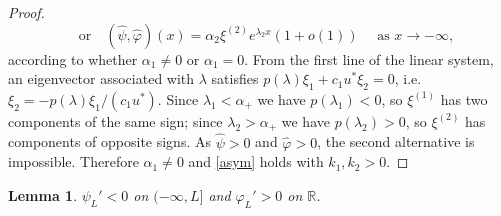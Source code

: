 \documentclass[reqno]{amsart}
\theoremstyle{plain}
\newtheorem{lemma}[theorem]{Lemma}
\theoremstyle{definition}
\theoremstyle{remark}
\begin{document}
\begin{proof}
\[	\quad\text{or}\quad
	(\hat\psi,\hat\varphi)(x)=\alpha_2\xi^{(2)}e^{\lambda_2x}(1+o(1))
	\quad\text{ as }x\to-\infty,
	\]
	according to whether $\alpha_1\ne0$ or $\alpha_1=0$. From the first line of
	the linear system, an eigenvector associated with $\lambda$ satisfies
	$p(\lambda)\xi_1+c_1u^*\xi_2=0$, i.e. $\xi_2=-p(\lambda)\xi_1/(c_1u^*)$.
	Since $\lambda_1<\alpha_+$ we have $p(\lambda_1)<0$, so $\xi^{(1)}$ has two
	components of the same sign; since $\lambda_2>\alpha_+$ we have
	$p(\lambda_2)>0$, so $\xi^{(2)}$ has components of opposite signs. As
	$\hat\psi>0$ and $\hat\varphi>0$, the second alternative is impossible.
	Therefore $\alpha_1\ne0$ and \eqref{asym} holds with $k_1,k_2>0$.
\end{proof}

\begin{lemma}\label{lm:mono}
	$\psi_L'<0$ on $(-\infty,L]$ and $\varphi_L'>0$ on $\mathbb{R}$.
\end{lemma}
\end{document}
